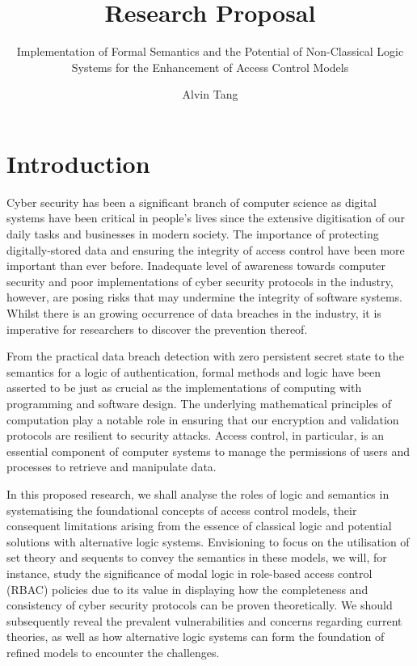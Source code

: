 \documentclass{article}
\title{Research Proposal}
\subtitle{Implementation of Formal Semantics and the Potential of Non-Classical Logic Systems for the Enhancement of Access Control Models}
\author{Alvin Tang}
\date{}
\begin{document}
\maketitle

\section*{Introduction}

Cyber security has been a significant branch of computer science as digital systems have been critical in people’s lives since the extensive digitisation of our daily tasks and businesses in modern society. The importance of protecting digitally-stored data and ensuring the integrity of access control have been more important than ever before. Inadequate level of awareness towards computer security and poor implementations of cyber security protocols in the industry, however, are posing risks that may undermine the integrity of software systems. Whilst there is an growing occurrence of data breaches in the industry, it is imperative for researchers to discover the prevention thereof.\cite{cyber-security}

From the practical data breach detection with zero persistent secret state\cite{zero-persistent} to the semantics for a logic of authentication\cite{logic-semantics}, formal methods and logic have been asserted to be just as crucial as the implementations of computing with programming and software design. The underlying mathematical principles of computation play a notable role in ensuring that our encryption and validation protocols are resilient to security attacks. Access control, in particular, is an essential component of computer systems to manage the permissions of users and processes to retrieve and manipulate data.

In this proposed research, we shall analyse the roles of logic and semantics in systematising the foundational concepts of access control models, their consequent limitations arising from the essence of classical logic and potential solutions with alternative logic systems. Envisioning to focus on the utilisation of set theory and sequents to convey the semantics in these models, we will, for instance, study the significance of modal logic in role-based access control (RBAC) policies due to its value in displaying how the completeness and consistency of cyber security protocols can be proven theoretically.\cite{modal-logic} We should subsequently reveal the prevalent vulnerabilities and concerns regarding current theories, as well as how alternative logic systems can form the foundation of refined models to encounter the challenges.
\end{document}
